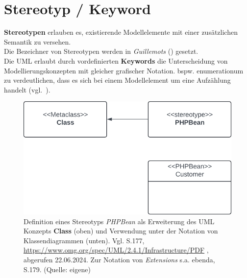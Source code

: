 \section{Stereotyp / Keyword}

\begin{tcolorbox}[title=Konzept der Stereotypen]
    \textbf{Stereotypen} erlauben es, existierende Modellelemente mit einer zusätzlichen Semantik zu versehen. \\
    Die Bezeichner von Stereotypen werden in \textit{Guillemots} (\guillemotleft \guillemotright) gesetzt.\\

    \noindent
    Die UML erlaubt durch vordefinierten \textbf{Keywords} die Unterscheidung von Modellierungskonzepten mit gleicher grafischer Notation.  bspw. \guillemotleft enumeration\guillemotright um zu verdeutlichen, dass es sich bei einem Modellelement um eine Aufzählung handelt (vgl.~\cite[28]{Bal05}).
\end{tcolorbox}


\begin{figure}
    \centering
    \includegraphics[scale=0.4]{chapters/Anhang/CheatSheets/SE3/img/stereotyp}
    \caption{
        Definition eines Stereotyps \textit{PHPBean} als Erweiterung des UML Konzepts \textbf{Class} (oben) und Verwendung unter der Notation von Klassendiagrammen (unten).
        Vgl. S.177, \url{https://www.omg.org/spec/UML/2.4.1/Infrastructure/PDF} , abgerufen 22.06.2024. Zur Notation von \textit{Extensions} s.a. ebenda, S.179.
        (Quelle: eigene)
    }
\end{figure}



